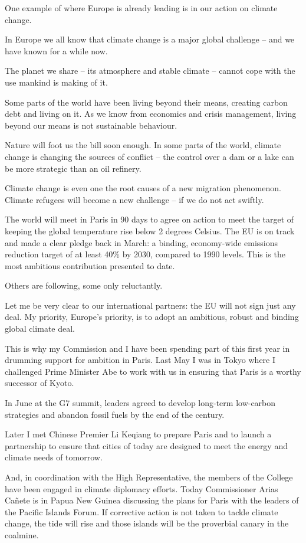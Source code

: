 \documentclass[a4paper,11pt]{article}
\begin{document}
One example of where Europe is already leading is in our action on climate change.

In Europe we all know that climate change is a major global challenge – and we have known for a while now.

The planet we share – its atmosphere and stable climate – cannot cope with the use mankind is making of it.

Some parts of the world have been living beyond their means, creating carbon debt and living on it. As we know from economics and crisis management, living beyond our means is not sustainable behaviour.

Nature will foot us the bill soon enough. In some parts of the world, climate change is changing the sources of conflict – the control over a dam or a lake can be more strategic than an oil refinery.

Climate change is even one the root causes of a new migration phenomenon. Climate refugees will become a new challenge – if we do not act swiftly.

The world will meet in Paris in 90 days to agree on action to meet the target of keeping the global temperature rise below 2 degrees Celsius. The EU is on track and made a clear pledge back in March: a binding, economy-wide emissions reduction target of at least 40\% by 2030, compared to 1990 levels. This is the most ambitious contribution presented to date.

Others are following, some only reluctantly.

Let me be very clear to our international partners: the EU will not sign just any deal. My priority, Europe's priority, is to adopt an ambitious, robust and binding global climate deal.

This is why my Commission and I have been spending part of this first year in drumming support for ambition in Paris. Last May I was in Tokyo where I challenged Prime Minister Abe to work with us in ensuring that Paris is a worthy successor of Kyoto.

In June at the G7 summit, leaders agreed to develop long-term low-carbon strategies and abandon fossil fuels by the end of the century.

Later I met Chinese Premier Li Keqiang to prepare Paris and to launch a partnership to ensure that cities of today are designed to meet the energy and climate needs of tomorrow.

And, in coordination with the High Representative, the members of the College have been engaged in climate diplomacy efforts. Today Commissioner Arias Cañete is in Papua New Guinea discussing the plans for Paris with the leaders of the Pacific Islands Forum. If corrective action is not taken to tackle climate change, the tide will rise and those islands will be the proverbial canary in the coalmine.
\end{document}
